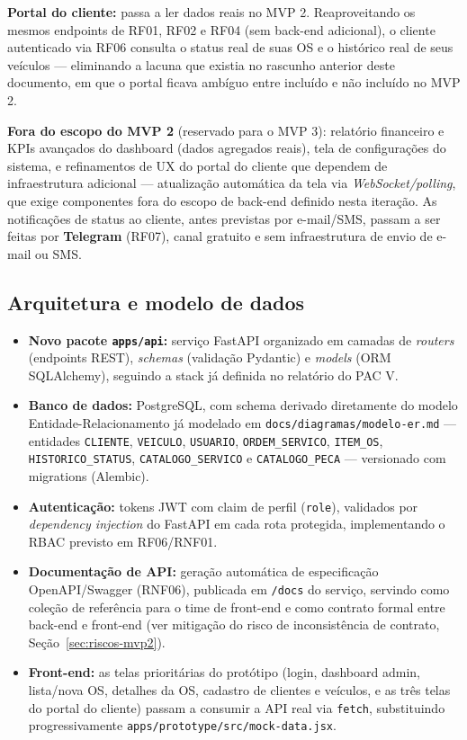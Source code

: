 \documentclass[11pt, a4paper]{article}
\begin{document}
\noindent\textbf{Portal do cliente:} passa a ler dados reais no MVP 2. Reaproveitando os mesmos endpoints de RF01, RF02 e RF04 (sem back-end adicional), o cliente autenticado via RF06 consulta o status real de suas OS e o histórico real de seus veículos --- eliminando a lacuna que existia no rascunho anterior deste documento, em que o portal ficava ambíguo entre incluído e não incluído no MVP 2.

\noindent\textbf{Fora do escopo do MVP 2} (reservado para o MVP 3): relatório financeiro e KPIs avançados do dashboard (dados agregados reais), tela de configurações do sistema, e refinamentos de UX do portal do cliente que dependem de infraestrutura adicional --- atualização automática da tela via \emph{WebSocket/polling}, que exige componentes fora do escopo de back-end definido nesta iteração. As notificações de status ao cliente, antes previstas por e-mail/SMS, passam a ser feitas por \textbf{Telegram} (RF07), canal gratuito e sem infraestrutura de envio de e-mail ou SMS.

\subsection{Arquitetura e modelo de dados}

\begin{itemize}
    \item \textbf{Novo pacote \texttt{apps/api}:} serviço FastAPI organizado em camadas de \emph{routers} (endpoints REST), \emph{schemas} (validação Pydantic) e \emph{models} (ORM SQLAlchemy), seguindo a stack já definida no relatório do PAC V.
    \item \textbf{Banco de dados:} PostgreSQL, com schema derivado diretamente do modelo Entidade-Relacionamento já modelado em \texttt{docs/diagramas/modelo-er.md} --- entidades \texttt{CLIENTE}, \texttt{VEICULO}, \texttt{USUARIO}, \texttt{ORDEM\_SERVICO}, \texttt{ITEM\_OS}, \texttt{HISTORICO\_STATUS}, \texttt{CATALOGO\_SERVICO} e \texttt{CATALOGO\_PECA} --- versionado com migrations (Alembic).
    \item \textbf{Autenticação:} tokens JWT com claim de perfil (\texttt{role}), validados por \emph{dependency injection} do FastAPI em cada rota protegida, implementando o RBAC previsto em RF06/RNF01.
    \item \textbf{Documentação de API:} geração automática de especificação OpenAPI/Swagger (RNF06), publicada em \texttt{/docs} do serviço, servindo como coleção de referência para o time de front-end e como contrato formal entre back-end e front-end (ver mitigação do risco de inconsistência de contrato, Seção~\ref{sec:riscos-mvp2}).
    \item \textbf{Front-end:} as telas prioritárias do protótipo (login, dashboard admin, lista/nova OS, detalhes da OS, cadastro de clientes e veículos, e as três telas do portal do cliente) passam a consumir a API real via \texttt{fetch}, substituindo progressivamente \texttt{apps/prototype/src/mock-data.jsx}.
\end{itemize}
\end{document}
